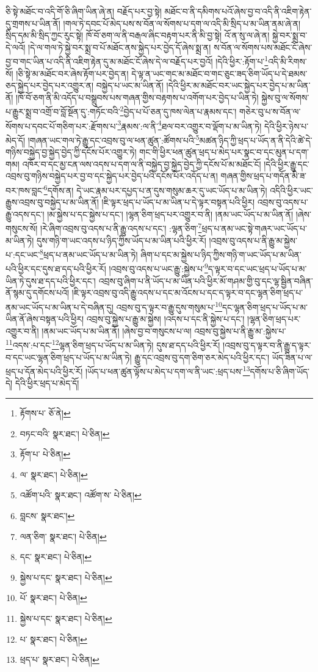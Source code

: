 ཅི་སྟེ་མཐོང་བ་འདི་གོ་ཅི་ཞིག་ཡིན་ཞེ་ན། བརྗོད་པར་བྱ་སྟེ། མཐོང་བ་ནི་དམིགས་པའོ་ཞེས་བྱ་བ་འདི་ནི་འཇིག་རྟེན་དུ་གྲགས་པ་ཡིན་ནོ། །གལ་ཏེ་དབང་པོ་མེད་པས་ས་བོན་ལ་སོགས་པ་དག་ལ་འདི་མི་སྲིད་པ་མ་ཡིན་ནམ་ཞེ་ན། སྲིད་དམ་མི་སྲིད་ཀྱང་རུང་སྟེ། ཁོ་བོ་ཅག་ལ་ནི་བརྒལ་ཞིང་བརྟག་པར་ནི་མི་བྱ་སྟེ། འོ་ན་སུ་ལ་ཞེ་ན། སྐྱེ་བར་སྨྲ་བ་དེ་ལའོ། །དེ་ལ་གལ་ཏེ་སྐྱེ་བར་སྨྲ་བ་པོ་མཐོང་ནས་སྐྱེད་པར་བྱེད་དོ་ཞེས་སྨྲ་ན། ས་བོན་ལ་སོགས་པས་མཐོང་ངོ་ཞེས་བྱ་བ་གང་ཡིན་པ་འདི་ནི་འཇིག་རྟེན་དུ་མ་མཐོང་ངོ་ཞེས་དེ་ལ་བརྗོད་པར་བྱའོ། །དེའི་ཕྱིར་:རྟོག་པ་\footnote{རྟོགས་པ་  ཅོ་ནེ། }འདི་མི་རིགས་སོ། །ཅི་སྟེ་མ་མཐོང་བར་ཞེས་རྟོག་པར་བྱེད་ན། དེ་ལྟ་ན་ཡང་གང་མ་མཐོང་བ་གང་ཅུང་ཟད་ཅིག་ཡོད་པ་དེ་ཐམས་ཅད་སྐྱེད་པར་བྱེད་པར་འགྱུར་ན། བསྐྱེད་པ་ཡང་མ་ཡིན་ནོ། །དེའི་ཕྱིར་མ་མཐོང་བར་ཡང་སྐྱེད་པར་བྱེད་པ་མ་ཡིན་ནོ། །ཁོ་བོ་ཅག་ནི་མི་འདོད་པ་བསྒྲུབས་པས་གཞན་གྱིས་བརྟགས་པ་འགོག་པར་བྱེད་པ་ཡིན་ཏེ། སྐྱེས་བུ་ལ་སོགས་པ་རྒྱུར་སྨྲ་བ་འགྲོ་བ་བློ་སྔོན་དུ་:གཏོང་བའི་\footnote{བཏང་བའི་  སྣར་ཐང་།  པེ་ཅིན། }བྱེད་པ་པོ་ཅན་དུ་ཁས་ལེན་པ་རྣམས་དང་། གཅེར་བུ་པ་ས་བོན་ལ་སོགས་པ་དབང་པོ་གཅིག་པར་:རྫོགས་པ་\footnote{རྟོག་པ་  པེ་ཅིན། }རྣམས་:ལ་ནི་\footnote{ལ་  སྣར་ཐང་།  པེ་ཅིན། }ཐལ་བར་འགྱུར་བ་ལྡོག་པ་མ་ཡིན་ཏེ། དེའི་ཕྱིར་ཉེས་པ་མེད་དོ། །གཞན་ཡང་གལ་ཏེ་རྒྱུ་དང་འབྲས་བུ་ལ་ཕན་ཚུན་:ཚོགས་པའི་\footnote{འཚོག་པའི་  སྣར་ཐང་། འཚོག་ས་  པེ་ཅིན། }མཚན་ཉིད་ཀྱི་ཕྲད་པ་ཡོད་ན་ནི་དེའི་ཚེ་དེ་གཉིས་བསྐྱེད་བྱ་སྐྱེད་བྱེད་ཀྱི་དངོས་པོར་འགྱུར་ཏེ། གང་གི་ཕྱིར་ཕན་ཚུན་ཕྲད་པ་མེད་པར་སྣང་བ་དང་མུན་པ་དག་གམ། འཁོར་བ་དང་མྱ་ངན་ལས་འདས་པ་དག་ལ་ནི་བསྐྱེད་བྱ་སྐྱེད་བྱེད་ཀྱི་དངོས་པོ་མ་མཐོང་ངོ། །དེའི་ཕྱིར་རྒྱུ་དང་འབྲས་བུ་གཉིས་བསྐྱེད་པར་བྱ་བ་དང་སྐྱེད་པར་བྱེད་པའི་དངོས་པོར་འདོད་པ་ན། གཞན་གྱིས་ཕྲད་པ་གདོན་མི་ཟ་བར་ཁས་བླང་\footnote{བླངས་  སྣར་ཐང་། }དགོས་ན། དེ་ཡང་རྣམ་པར་དཔྱད་པ་ན་དུས་གསུམ་ཆར་དུ་ཡང་ཡོད་པ་མ་ཡིན་ཏེ། འདིའི་ཕྱིར་ཡང་རྒྱུས་འབྲས་བུ་བསྐྱེད་པ་མ་ཡིན་ནོ། །ཇི་ལྟར་ཕྲད་པ་ཡོད་པ་མ་ཡིན་པ་དེ་ལྟར་བསྟན་པའི་ཕྱིར། འབྲས་བུ་འདས་པ་རྒྱུ་འདས་དང་། །མ་སྐྱེས་པ་དང་སྐྱེས་པ་དང་། །ལྷན་ཅིག་ཕྲད་པར་འགྱུར་བ་ནི། །ནམ་ཡང་ཡོད་པ་མ་ཡིན་ནོ། །ཞེས་གསུངས་སོ། །རེ་ཞིག་འབྲས་བུ་འདས་པ་ནི་རྒྱུ་འདས་པ་དང་། :ལྷན་ཅིག་\footnote{ལན་ཅིག་  སྣར་ཐང་།  པེ་ཅིན། }ཕྲད་པ་ནམ་ཡང་སྟེ་གཞར་ཡང་ཡོད་པ་མ་ཡིན་ཏེ། དུས་གཉི་ག་ཡང་འདས་པ་ཉིད་ཀྱིས་ཡོད་པ་མ་ཡིན་པའི་ཕྱིར་རོ། །འབྲས་བུ་འདས་པ་ནི་རྒྱུ་མ་སྐྱེས་པ་:དང་ཡང་\footnote{དང་  སྣར་ཐང་།  པེ་ཅིན། }ཕྲད་པ་ནམ་ཡང་ཡོད་པ་མ་ཡིན་ཏེ། ཞིག་པ་དང་མ་སྐྱེས་པ་ཉིད་ཀྱིས་གཉི་ག་ཡང་ཡོད་པ་མ་ཡིན་པའི་ཕྱིར་དང་དུས་ཐ་དད་པའི་ཕྱིར་རོ། །འབྲས་བུ་འདས་པ་ཡང་རྒྱུ་:སྐྱེས་པ་\footnote{སྐྱེས་པ་དང་  སྣར་ཐང་།  པེ་ཅིན། }ད་ལྟར་བ་དང་ཡང་ཕྲད་པ་ཡོད་པ་མ་ཡིན་ཏེ་དུས་ཐ་དད་པའི་ཕྱིར་དང་། འབྲས་བུ་ཞིག་པ་ནི་ཡོད་པ་མ་ཡིན་པའི་ཕྱིར་མོ་གཤམ་གྱི་བུ་དང་ལྷ་སྦྱིན་བཞིན་ནོ་སྙམ་དུ་དགོངས་པའོ། །ཇི་ལྟར་འབྲས་བུ་འདི་རྒྱུ་འདས་པ་དང་མ་འོངས་པ་དང་ད་ལྟར་བ་དང་ལྷན་ཅིག་ཕྲད་པ་ནམ་ཡང་ཡོད་པ་མ་ཡིན་པ་དེ་བཞིན་དུ། འབྲས་བུ་ད་ལྟར་བ་རྒྱུ་དུས་གསུམ་པ་\footnote{པོ་  སྣར་ཐང་།  པེ་ཅིན། }དང་ལྷན་ཅིག་ཕྲད་པ་ཡོད་པ་མ་ཡིན་ནོ་ཞེས་བསྟན་པའི་ཕྱིར། འབྲས་བུ་སྐྱེས་པ་རྒྱུ་མ་སྐྱེས། །འདས་པ་དང་ནི་སྐྱེས་པ་དང་། །ལྷན་ཅིག་ཕྲད་པར་འགྱུར་བ་ནི། །ནམ་ཡང་ཡོད་པ་མ་ཡིན་ནོ། །ཞེས་བྱ་བ་གསུངས་པ་ལ། འབྲས་བུ་སྐྱེས་པ་ནི་རྒྱུ་མ་:སྐྱེས་པ་\footnote{སྐྱེས་པ་དང་  སྣར་ཐང་།  པེ་ཅིན། }འདས་:པ་དང་\footnote{པ་  སྣར་ཐང་།  པེ་ཅིན། }ལྷན་ཅིག་ཕྲད་པ་ཡོད་པ་མ་ཡིན་ཏེ། དུས་ཐ་དད་པའི་ཕྱིར་རོ། །འབྲས་བུ་ད་ལྟར་བ་ནི་རྒྱུ་ད་ལྟར་བ་དང་ཡང་ལྷན་ཅིག་ཕྲད་པ་ཡོད་པ་མ་ཡིན་ཏེ། རྒྱུ་དང་འབྲས་བུ་དག་ཅིག་ཅར་མེད་པའི་ཕྱིར་དང་། ཡོད་ཟིན་པ་ལ་ཕྲད་པ་དོན་མེད་པའི་ཕྱིར་རོ། །ཡོད་པ་ཕན་ཚུན་ལྟོས་པ་མེད་པ་དག་ལ་ནི་ཡང་:ཕྲད་པས་\footnote{ཕྲད་པ་  སྣར་ཐང་།  པེ་ཅིན། }དགོས་པ་ཅི་ཞིག་ཡོད་དེ། དེའི་ཕྱིར་ཕྲད་པ་མེད་དོ། 